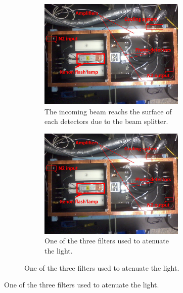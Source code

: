 \begin{figure}[!hbtp]
  \begin{figure}[!hbtp]
  \centering
  \begin{subfigure}{.5\textwidth}
    \includegraphics[totalheight=.35\textwidth,trim=0cm 7cm 0cm 2.5cm, clip=true,]{../Pictures/blabla/box.jpg}%
    \caption{The incoming beam reachs the surface of each detectors due to the beam splitter.}
    \label{fig:beam_splitter}
  \end{subfigure}%
  \begin{subfigure}{.5\textwidth}
    \includegraphics[totalheight=.35\textwidth,trim=0cm 7cm 0cm 2.5cm, clip=true,]{../Pictures/blabla/box.jpg}
    \caption{One of the three filters used to atenuate the light.}
    \label{fig:filters}
  \end{subfigure}
  \end{figure}
  

\end{figure}
